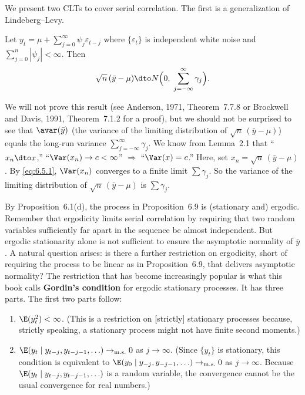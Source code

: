We present two CLTs to cover serial correlation. The first is a generalization of
Lindeberg--Levy.

\begin{proposition}
\label{prop:6.9}
Let $y_t = \mu + \sum_{j=0}^{\infty} \psi_j \varepsilon_{t-j}$ where $\{\varepsilon_t\}$ is
independent white noise and $\sum_{j=0}^{n} |\psi_j| < \infty$. Then
\begin{equation}
  \sqrt{n}\,(\bar{y} - \mu) \dto N\Bigl(0,\; \sum_{j=-\infty}^{\infty} \gamma_j\Bigr).
  \label{eq:6.5.3}
\end{equation}
\end{proposition}

We will not prove this result (see Anderson, 1971, Theorem~7.7.8 or Brockwell
and Davis, 1991, Theorem~7.1.2 for a proof), but we should not be surprised to
see that $\avar(\bar{y})$ (the variance of the limiting distribution of $\sqrt{n}\,(\bar{y} - \mu)$) equals
the long-run variance $\sum_{j=-\infty}^{\infty} \gamma_j$. We know from Lemma~2.1 that ``$x_n \dto x$,''
``$\Var(x_n) \to c < \infty$'' $\Rightarrow$ ``$\Var(x) = c$.'' Here, set $x_n = \sqrt{n}\,(\bar{y} - \mu)$. By \eqref{eq:6.5.1},
$\Var(x_n)$ converges to a finite limit $\sum \gamma_j$. So the variance of the limiting distribution
of $\sqrt{n}\,(\bar{y} - \mu)$ is $\sum \gamma_j$.

By Proposition~6.1(d), the process in Proposition~6.9 is (stationary and) ergodic.
Remember that ergodicity limits serial correlation by requiring that two random
variables sufficiently far apart in the sequence be almost independent. But ergodic
stationarity alone is not sufficient to ensure the asymptotic normality of $\bar{y}$. A natural
question arises: is there a further restriction on ergodicity, short of requiring the
process to be linear as in Proposition~6.9, that delivers asymptotic normality? The
restriction that has become increasingly popular is what this book calls \textbf{Gordin's
condition} for ergodic stationary processes. It has three parts. The first two parts
follow:
\begin{enumerate}[label=(\alph*)]
\item $\E(y_t^2) < \infty$. (This is a restriction on [strictly] stationary processes because,
strictly speaking, a stationary process might not have finite second moments.)

\item $\E(y_t \mid y_{t-j}, y_{t-j-1}, \ldots) \to_{\mathrm{m.s.}} 0$ as $j \to \infty$. (Since $\{y_t\}$ is stationary, this
condition is equivalent to $\E(y_0 \mid y_{-j}, y_{-j-1}, \ldots) \to_{\mathrm{m.s.}} 0$ as $j \to \infty$. Because
$\E(y_t \mid y_{t-j}, y_{t-j-1}, \ldots)$ is a random variable, the convergence cannot be the
usual convergence for real numbers.)
\end{enumerate}


